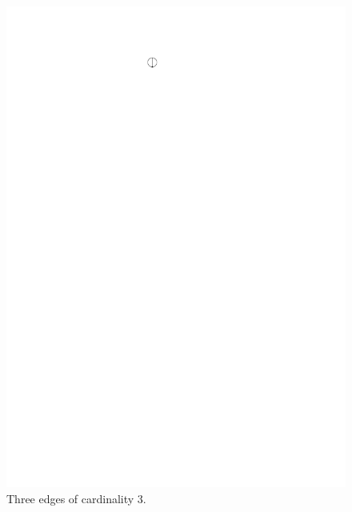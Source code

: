 \documentclass[a4paper]{article}
\theoremstyle{definition}
\begin{document}
\begin{figure}[htbp]
\begin{center}
\includegraphics[scale=1.5]{fig/he3}
\caption{Three edges of cardinality 3.}
\label{e3}

\end{center}
\end{figure}
\end{document}
